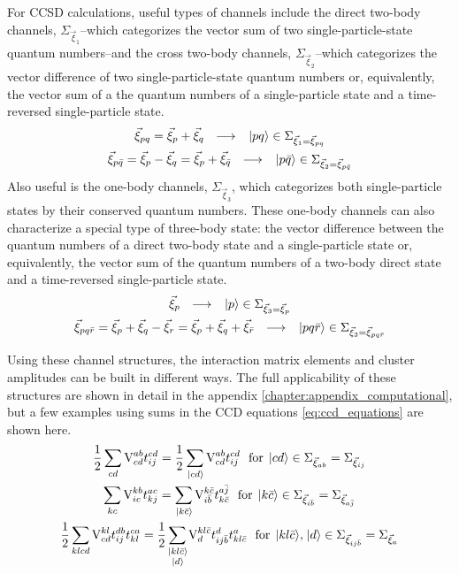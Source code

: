 \documentclass[thesis.tex]{subfiles}
\begin{document}
For CCSD calculations, useful types of channels include the direct two-body channels, $\Sigma_{\vec{\xi}_{1}}$--which categorizes the vector sum of two single-particle-state quantum numbers--and the cross two-body channels, $\Sigma_{\vec{\xi}_{2}}$--which categorizes the vector difference of two single-particle-state quantum numbers or, equivalently, the vector sum of a the quantum numbers of a single-particle state and a time-reversed single-particle state.
\begin{gather}
  \vec{\xi}_{pq} = \vec{\xi}_{p} + \vec{\xi}_{q}\ \ \longrightarrow\ \ \ket{pq} \in \Sigma_{\vec{\xi}_{1}=\vec{\xi}_{pq}} \\
  \vec{\xi}_{p\bar{q}} = \vec{\xi}_{p} - \vec{\xi}_{q} = \vec{\xi}_{p} + \vec{\xi}_{\bar{q}}\ \ \longrightarrow\ \ \ket{p\bar{q}} \in \Sigma_{\vec{\xi}_{2}=\vec{\xi}_{p\bar{q}}}
\end{gather}
Also useful is the one-body channels, $\Sigma_{\vec{\xi}_{3}}$, which categorizes both single-particle states by their conserved quantum numbers.  These one-body channels can also characterize a special type of three-body state: the vector difference between the quantum numbers of a direct two-body state and a single-particle state or, equivalently, the vector sum of the quantum numbers of a two-body direct state and a time-reversed single-particle state.
\begin{gather}
  \vec{\xi}_{p}\ \ \longrightarrow\ \ \ket{p} \in \Sigma_{\vec{\xi}_{3}=\vec{\xi}_{p}} \\
  \vec{\xi}_{pq\bar{r}} = \vec{\xi}_{p} + \vec{\xi}_{q} - \vec{\xi}_{r} = \vec{\xi}_{p} + \vec{\xi}_{q} + \vec{\xi}_{\bar{r}}\ \ \longrightarrow\ \ \ket{pq\bar{r}} \in \Sigma_{\vec{\xi}_{3}=\vec{\xi}_{pq\bar{r}}}
\end{gather}

Using these channel structures, the interaction matrix elements and cluster amplitudes can be built in different ways.  The full applicability of these structures are shown in detail in the appendix \ref{chapter:appendix_computational}, but a few examples using sums in the CCD equations \eqref{eq:ccd_equations} are shown here.
\begin{gather} \label{eq:channel_sums}
  \frac{1}{2}\sum\limits_{\mathclap{cd}}\vint{ab}{cd}\tamp{cd}{ij} = \frac{1}{2}\sum\limits_{\mathclap{\ket{cd}}}\vint{ab}{cd}\tamp{cd}{ij}\ \ \text{for}\ \ket{cd} \in \Sigma_{\vec{\xi}_{ab}}=\Sigma_{\vec{\xi}_{ij}} \notag \\
  \sum\limits_{\mathclap{kc}}\vint{kb}{ic}\tamp{ac}{kj} = \sum\limits_{\mathclap{\ket{k\bar{c}}}}\vint{k\bar{c}}{i\bar{b}}\tamp{a\bar{j}}{k\bar{c}}\ \ \text{for}\ \ket{k\bar{c}} \in \Sigma_{\vec{\xi}_{i\bar{b}}}=\Sigma_{\vec{\xi}_{a\bar{j}}} \notag \\
  \frac{1}{2}\sum\limits_{\mathclap{klcd}}\vint{kl}{cd}\tamp{db}{ij}\tamp{ca}{kl} = \frac{1}{2}\sum\limits_{\mathclap{\substack{\ket{kl\bar{c}} \\ \ket{d}}}}\vint{kl\bar{c}}{d}\tamp{d}{ij\bar{b}}\tamp{a}{kl\bar{c}}\ \ \text{for}\ \ket{kl\bar{c}},\ket{d} \in \Sigma_{\vec{\xi}_{ij\bar{b}}}=\Sigma_{\vec{\xi}_{a}}
\end{gather}
\end{document}
